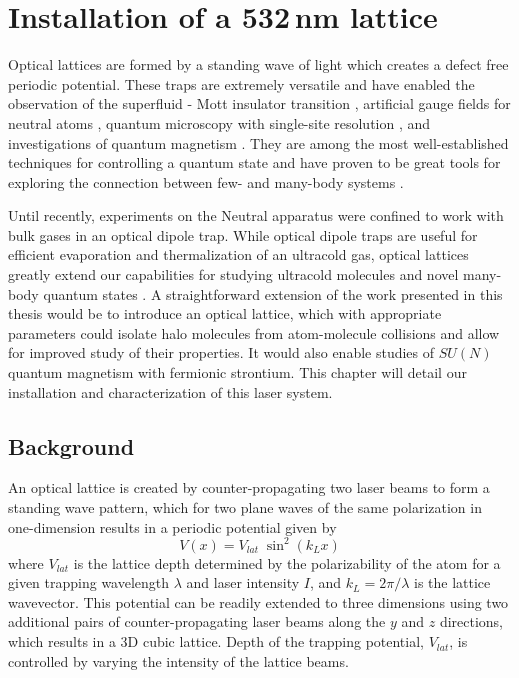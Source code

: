 \chapter{Installation of a 532\,nm lattice} \label{ch:chap6}
	
Optical lattices are formed by a standing wave of light which creates a defect free periodic potential.
These traps are extremely versatile and have enabled the observation of the superfluid - Mott insulator transition \cite{gme02}, artificial gauge fields for neutral atoms \cite{Lin2011a}, quantum microscopy with single-site resolution \cite{Bakr2009}, and investigations of quantum magnetism \cite{Hart2015,Greif2015}. 
They are among the most well-established techniques for controlling a quantum state and have proven to be great tools for exploring the connection between few- and many-body systems \cite{bdz08}.

Until recently, experiments on the Neutral apparatus were confined to work with bulk gases in an optical dipole trap.
While optical dipole traps are useful for efficient evaporation and thermalization of an ultracold gas, optical lattices greatly extend our capabilities for studying ultracold molecules and novel many-body quantum states \cite{mtj00,Thalhammer2006,mob06,lsb08,Cappellini2014,zbb14}.
A straightforward extension of the work presented in this thesis would be to introduce an optical lattice, which with appropriate parameters could isolate halo molecules from atom-molecule collisions and allow for improved study of their properties.
It would also enable studies of $SU(N)$ quantum magnetism with fermionic strontium.
This chapter will detail our installation and characterization of this laser system.

\section{Background} \label{sec:latBackground}
An optical lattice is created by counter-propagating two laser beams to form a standing wave pattern, which for two plane waves of the same polarization in one-dimension results in a periodic potential given by 
	\begin{equation} \label{eq:1dlattice}
		 V(x) = V_{lat} \; \sin^2(k_L x)
	\end{equation}
where $V_{lat}$ is the lattice depth determined by the polarizability of the atom for a given trapping wavelength $\lambda$ and laser intensity $I$, and $k_L = 2\pi / \lambda$ is the lattice wavevector.
This potential can be readily extended to three dimensions using two additional pairs of counter-propagating laser beams along the $y$ and $z$ directions, which results in a 3D cubic lattice.
Depth of the trapping potential, $V_{lat}$, is controlled by varying the intensity of the lattice beams.

